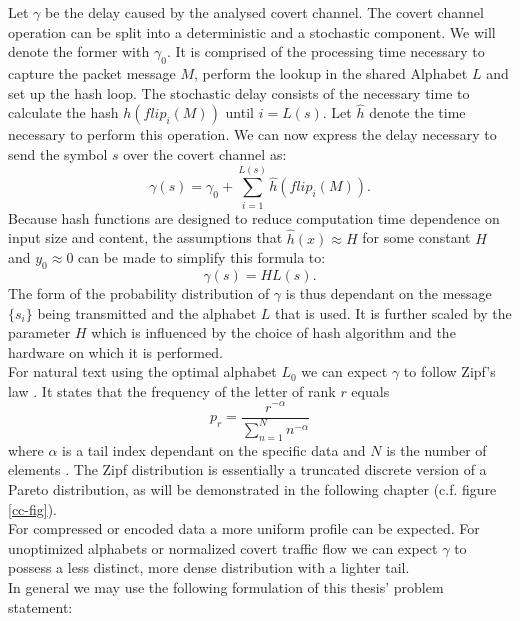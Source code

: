 \documentclass[12pt,a4paper,automark, toc=bib]{scrreprt}
\theoremstyle{definition}
\begin{document}
			Let $\gamma$ be the delay caused by the analysed covert channel. The covert channel operation can be split into a deterministic and a stochastic component. We will denote the former with $\gamma_0$. It is comprised of the processing time necessary to capture the packet message $M$, perform the lookup in the shared Alphabet $L$ and set up the hash loop. The stochastic delay consists of the necessary time to calculate the hash $h(flip_i(M))$ until $i=L(s)$. Let $\hat{h}$ denote the time necessary to perform this operation. We can now express the delay necessary to send the symbol $s$ over the covert channel as:
			\begin{equation}
				\gamma(s) = \gamma_0 + \sum_{i=1}^{L(s)}{\hat{h}(flip_i(M))}.
			\end{equation}
			Because hash functions are designed to reduce computation time dependence on input size and content, the assumptions that $\hat{h}(x) \approx H$ for some constant $H$ and $y_0 \approx 0$ can be made to simplify this formula to:
			\begin{equation}
				\gamma(s) = H L(s).
			\end{equation} 
			The form of the probability distribution of $\gamma$ is thus dependant on the message $\{s_i\}$ being transmitted and the alphabet $L$ that is used. It is further scaled by the parameter $H$ which is influenced by the choice of hash algorithm and the hardware on which it is performed.\\
			For natural text using the optimal alphabet $L_0$ we can expect $\gamma$ to follow Zipf's law  \cite{zipf_web, Corral2015}. It states that the frequency of the letter of rank $r$ equals \begin{equation}
				p_r = \frac{r^{-\alpha}} {\sum_{n=1}^{N}{n^{-\alpha}}}
			\end{equation}
			where $\alpha$ is a tail index dependant on the specific data and $N$ is the number of elements  \cite{zipf_web2}. The Zipf distribution is essentially a truncated discrete version of a Pareto distribution, as will be demonstrated in the following chapter (c.f. figure \ref{cc-fig}).\\
			For compressed or encoded data a more uniform profile can be expected. For unoptimized alphabets or normalized covert traffic flow we can expect $\gamma$ to possess a less distinct, more dense distribution with a lighter tail.\\
			In general we may use the following formulation of this thesis' problem statement:
\end{document}

